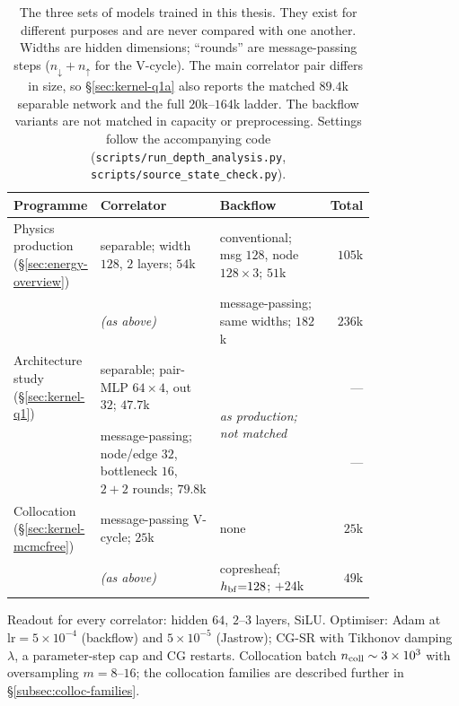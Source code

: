 \begin{table}[htbp]\centering
\caption[Architecture and training hyperparameters]{The three sets of models trained in this
thesis. They exist for different purposes and are never compared with one another. Widths are
hidden dimensions; ``rounds'' are message-passing steps ($n_\downarrow{+}n_\uparrow$ for the
  V-cycle). The main correlator pair differs in size, so \S\ref{sec:kernel-q1a} also reports
  the matched $89.4$k separable network and the full $20$k--$164$k ladder. The backflow
  variants are not matched in capacity or preprocessing. Settings follow the accompanying code
(\texttt{scripts/run\_depth\_analysis.py}, \texttt{scripts/source\_state\_check.py}).}
\label{tab:hyperparams}
\setlength{\tabcolsep}{5pt}
\renewcommand{\arraystretch}{1.25}
\begin{tabular}{@{}p{0.165\linewidth} p{0.335\linewidth} p{0.30\linewidth} r@{}}
\hline
Programme & Correlator & Backflow & Total \\
\hline
Physics production (\S\ref{sec:energy-overview})
  & separable; width $128$, $2$ layers; $54$k
  & conventional; msg $128$, node $128\times3$; $51$k & $105$k \\
  & \emph{(as above)} & message-passing; same widths; $182$k & $236$k \\
\hline
Architecture study (\S\ref{sec:kernel-q1})
  & separable; pair-MLP $64\times4$, out $32$; $47.7$k
  & \multirow{2}{*}{\emph{as production; not matched}} & --- \\
  & message-passing; node/edge $32$, bottleneck $16$, $2{+}2$ rounds; $79.8$k & & --- \\
\hline
Collocation (\S\ref{sec:kernel-mcmcfree})
  & message-passing V-cycle; $25$k & none & $25$k \\
  & \emph{(as above)} & copresheaf; $h_{\rm bf}{=}128$; $+24$k & $49$k \\
\hline
\end{tabular}

\medskip
\small\noindent Readout for every correlator: hidden $64$, $2$--$3$ layers, SiLU.
Optimiser: Adam at $\mathrm{lr}=5\times10^{-4}$ (backflow) and $5\times10^{-5}$ (Jastrow);
CG-SR with Tikhonov damping $\lambda$, a parameter-step cap and CG restarts. Collocation batch
$n_{\rm coll}\sim3\times10^{3}$ with oversampling $m=8$--$16$; the collocation families are
described further in \S\ref{subsec:colloc-families}.
\end{table}


